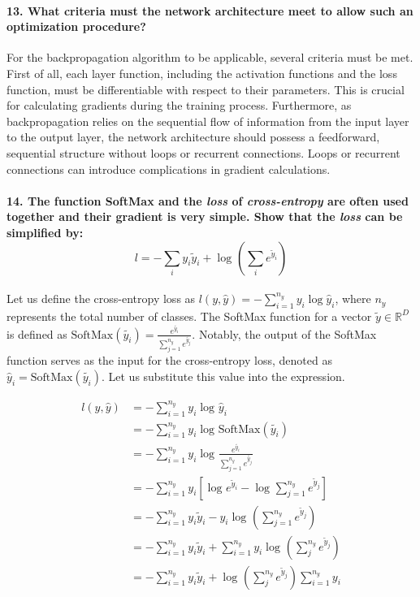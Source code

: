 \paragraph{13. What criteria must the network architecture meet to allow such an optimization procedure?}
For the backpropagation algorithm to be applicable, several criteria must be met. First of all, each layer function, including the activation functions and the loss function, must be differentiable with respect to their parameters. This is crucial for calculating gradients during the training process. Furthermore, as backpropagation relies on the sequential flow of information from the input layer to the output layer, the network architecture should possess a feedforward, sequential structure without loops or recurrent connections. Loops or recurrent connections can introduce complications in gradient calculations.

\paragraph{14. The function SoftMax and the \textit{loss} of \textit{cross-entropy} are often used together and their gradient is very simple. Show that the \textit{loss} can be simpliﬁed by:
    \[l = - \sum_{i}^{} y_i \tilde{y}_i + \log_{} \left(\sum_{i}^{} e^{\tilde{y}_i}\right)\]}
Let us define the cross-entropy loss as \( l(y, \hat{y}) = - \sum_{i=1}^{n_y} y_i \log \hat{y}_i \), where \( n_y \) represents the total number of classes. The SoftMax function for a vector \( \tilde{y} \in \mathbb{R}^D \) is defined as \( \text{SoftMax}(\tilde{y_i}) = \frac{e^{\tilde{y_i}}}{\sum_{j=1}^{n_y} e^{\tilde{y_j}}} \). Notably, the output of the SoftMax function serves as the input for the cross-entropy loss, denoted as \( \hat{y}_i = \text{SoftMax}(\tilde{y_i}) \). Let us substitute this value into the expression.

\begin{align*}
    l(y, \hat{y}) & = - \sum_{i=1}^{n_y} y_i \log_{} \hat{y}_i                                                                 \\
                  & = - \sum_{i=1}^{n_y} y_i \log_{} \text{SoftMax}(\tilde{y_i})                                               \\
                  & = - \sum_{i=1}^{n_y} y_i \log_{} \frac{e^{\tilde{y_i}}}{\sum_{j=1}^{n_y} e^{\tilde{y_j}} }                   \\
                  & = - \sum_{i=1}^{n_y} y_i \left[ \log_{} e^{\tilde{y}_i} - \log_{} \sum_{j=1}^{n_y} e^{\tilde{y}_j}  \right]  \\
                  & = - \sum_{i=1}^{n_y} y_i \tilde{y}_i - y_i \log_{} \left( \sum_{j=1}^{n_y}e^{\tilde{y}_j} \right)                           \\
                  & = - \sum_{i=1}^{n_y} y_i \tilde{y}_i + \sum_{i=1}^{n_y} y_i \log_{} \left(\sum_{j}^{n_y}e^{\tilde{y}_j}\right) \\
                  & = - \sum_{i=1}^{n_y} y_i \tilde{y}_i + \log_{} \left(\sum_{j}^{n_y}e^{\tilde{y}_j}\right) \sum_{i=1}^{n_y} y_i
\end{align*}

